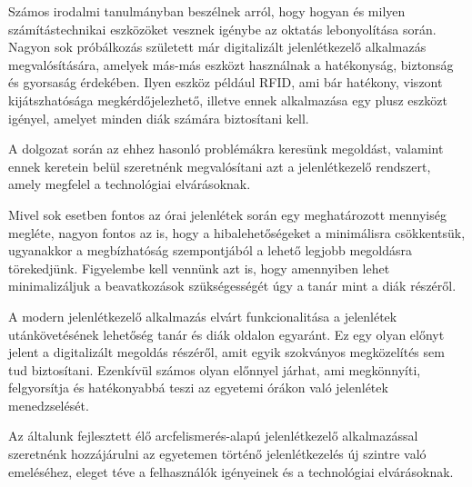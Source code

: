 Számos irodalmi tanulmányban beszélnek arról, hogy hogyan és milyen számítástechnikai eszközöket vesznek igénybe az oktatás lebonyolítása során. Nagyon sok próbálkozás született már digitalizált jelenlétkezelő alkalmazás megvalósítására, amelyek más-más eszközt használnak a hatékonyság, biztonság és gyorsaság érdekében. Ilyen eszköz például RFID, ami bár hatékony, viszont kijátszhatósága megkérdőjelezhető, illetve ennek alkalmazása egy plusz eszközt igényel, amelyet minden diák számára biztosítani kell. 

A dolgozat során az ehhez hasonló problémákra keresünk megoldást, valamint ennek keretein belül szeretnénk megvalósítani azt a jelenlétkezelő rendszert, amely megfelel a technológiai elvárásoknak. 

Mivel sok esetben fontos az órai jelenlétek során egy meghatározott mennyiség megléte, nagyon fontos az is, hogy a hibalehetőségeket a minimálisra csökkentsük, ugyanakkor a megbízhatóság szempontjából a lehető legjobb megoldásra törekedjünk. Figyelembe kell vennünk azt is, hogy amennyiben lehet minimalizáljuk a beavatkozások szükségességét úgy a tanár mint a diák részéről. 

A modern jelenlétkezelő alkalmazás elvárt funkcionalitása a jelenlétek utánkövetésének lehetőség tanár és diák oldalon egyaránt. Ez egy olyan előnyt jelent a digitalizált megoldás részéről, amit egyik szokványos megközelítés sem tud biztosítani. Ezenkívül számos olyan előnnyel járhat, ami megkönnyíti, felgyorsítja és hatékonyabbá teszi az egyetemi órákon való jelenlétek menedzselését.

Az általunk fejlesztett élő arcfelismerés-alapú jelenlétkezelő alkalmazással szeretnénk hozzájárulni az egyetemen történő jelenlétkezelés új szintre való emeléséhez, eleget téve a felhasználók igényeinek és a technológiai elvárásoknak.
